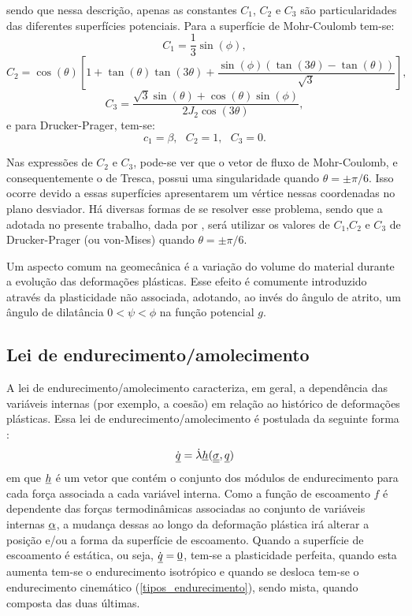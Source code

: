 sendo que nessa descrição, apenas as constantes $C_1$, $C_2$  e $C_3$ são particularidades das diferentes superfícies potenciais. Para a superfície de Mohr-Coulomb tem-se:
\begin{equation}
	\label{eq:c1MC}
	C_1 = \dfrac{1}{3}\sin(\phi),
\end{equation}
\begin{equation}
	\label{eq:c2MC}
	C_2 = \cos(\theta)\left[1+\tan(\theta)\tan(3\theta) + \dfrac{\sin(\phi)\left(\tan(3\theta)-\tan(\theta)\right)}{\sqrt{3}}\right],
\end{equation}
\begin{equation}
	\label{eq:c3MC}
	C_3 = \dfrac{\sqrt{3}\sin(\theta)+\cos(\theta)\sin(\phi)}{2J_2\cos(3\theta)},
\end{equation}
e para Drucker-Prager, tem-se:
\begin{equation}
	\label{eq:c1c2c3DP}
	c_1 = \beta,~~~C_2 = 1,~~~C_3 = 0.
\end{equation}

Nas expressões de $C_2$ e $C_3$, pode-se ver que o vetor de fluxo de Mohr-Coulomb, e consequentemente o de Tresca, possui uma singularidade quando $\theta = \pm \pi/6$. Isso ocorre devido a essas superfícies apresentarem um vértice nessas coordenadas no plano desviador. Há diversas formas de se resolver esse problema, sendo que a adotada no presente trabalho, dada por , será utilizar os valores de $C_1$,$C_2$ e $C_3$ de Drucker-Prager (ou von-Mises) quando $\theta = \pm \pi/6$.

Um aspecto comum na geomecânica é a variação do volume do material durante a evolução das deformações plásticas. Esse efeito é comumente introduzido através da plasticidade não associada, adotando, ao invés do ângulo de atrito, um ângulo de dilatância $0<\psi<\phi$  na função potencial $g$.

\subsection{Lei de endurecimento/amolecimento}
A lei de endurecimento/amolecimento caracteriza, em geral, a dependência das variáveis internas (por exemplo, a coesão) em relação ao histórico de deformações plásticas. Essa lei de endurecimento/amolecimento é postulada da seguinte forma \cite[p. 249]{Belytschko2000}:
\begin{equation}
	\label{eq:amolecimento}
	\dot {\underline q} = \dot \lambda \underline h(\underline{\underline \sigma},\underline q)
\end{equation}
em que $\underline h$ é um vetor que contém o conjunto dos módulos de endurecimento para cada força associada a cada variável interna. Como a função de escoamento $f$ é dependente das forças termodinâmicas associadas ao conjunto de variáveis internas $\underline \alpha$, a mudança dessas ao longo da deformação plástica irá alterar a posição e/ou a forma da superfície de escoamento. Quando a superfície de escoamento é estática, ou seja, $\dot {\underline q}=\underline 0$, tem-se a plasticidade perfeita, quando esta aumenta tem-se o endurecimento isotrópico e quando se desloca tem-se o endurecimento cinemático (\autoref{tipos_endurecimento}), sendo mista, quando composta das duas últimas.

